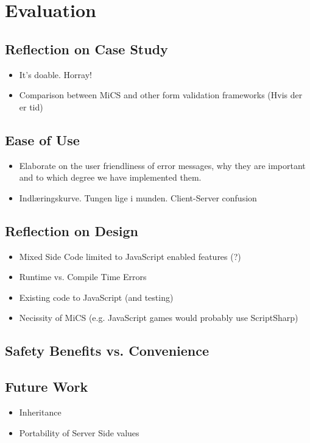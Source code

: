 \chapter{Evaluation}

\section{Reflection on Case Study} %
\label{sec:reflection_on_case_study}
	\begin{itemize}
		\item It's doable. Horray!
		\item Comparison between MiCS and other form validation frameworks (Hvis der er tid)
	\end{itemize}

\section{Ease of Use} %
\label{sec:ease_of_use}

	\begin{itemize}
		\item Elaborate on the user friendliness of error messages, why they are important
		and to which degree we have implemented them.
		\item Indlæringskurve. Tungen lige i munden. Client-Server confusion
	\end{itemize}


\section{Reflection on Design} %
\label{sec:reflection_on_design_goals}
	\begin{itemize}
		\item Mixed Side Code limited to JavaScript enabled features (?)
		\item Runtime vs. Compile Time Errors
		\item Existing code to JavaScript (and testing)
		\item Necissity of MiCS (e.g. JavaScript games would probably use ScriptSharp)
	\end{itemize}



\section{Safety Benefits vs. Convenience} %
\label{sec:safety_benefits_vs_conveniente}


\section{Future Work}
\begin{itemize}
	\item Inheritance
	\item Portability of Server Side values
\end{itemize}